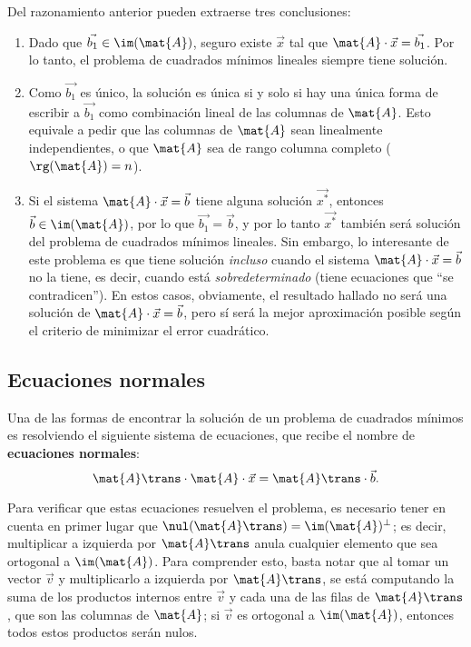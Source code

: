 Del razonamiento anterior pueden extraerse tres conclusiones:
\begin{enumerate}[label=(\roman*)]
\item Dado que $\vec{b_1} \in \im(\mat{A})$, seguro existe $\vec{x}$ tal que
    $\mat{A} \cdot \vec{x} = \vec{b_1}$. Por lo tanto, el problema de
    cuadrados mínimos lineales siempre tiene solución.
\item Como $\vec{b_1}$ es único, la solución es única si y solo si hay
    una única forma de escribir a $\vec{b_1}$ como combinación lineal de las
    columnas de $\mat{A}$. Esto equivale a pedir que las columnas de $\mat{A}$
    sean linealmente independientes, o que $\mat{A}$ sea de rango columna
    completo ($\rg(\mat{A}) = n$).
\item Si el sistema $\mat{A} \cdot \vec{x} = \vec{b}$ tiene alguna solución
    $\vec{x^\ast}$, entonces $\vec{b} \in \im(\mat{A})$, por lo que
    $\vec{b_1} = \vec{b}$, y por lo tanto
    $\vec{x^\ast}$ también será solución del problema de cuadrados mínimos
    lineales.
    Sin embargo, lo interesante de este problema es que tiene solución
    \emph{incluso} cuando el sistema $\mat{A} \cdot \vec{x} = \vec{b}$ no
    la tiene, es decir, cuando está \emph{sobredeterminado} (tiene ecuaciones
    que ``se contradicen''). En estos casos, obviamente, el resultado
    hallado no será una solución de $\mat{A} \cdot \vec{x} = \vec{b}$,
    pero sí será la mejor aproximación posible según el criterio de
    minimizar el error cuadrático.
\end{enumerate}

\subsection{Ecuaciones normales}
Una de las formas de encontrar la solución de un problema de cuadrados
mínimos es resolviendo el siguiente sistema de ecuaciones, que recibe el
nombre de \textbf{ecuaciones normales}:
\[ \mat{A}\trans \cdot \mat{A} \cdot \vec{x} = \mat{A}\trans \cdot \vec{b}. \]

Para verificar que estas ecuaciones resuelven el problema, es necesario tener
en cuenta en primer lugar que
$\nul(\mat{A}\trans) = \im(\mat{A})^{\bot}$; es decir, multiplicar a izquierda
por $\mat{A}\trans$ anula cualquier elemento que sea ortogonal a
$\im(\mat{A})$. Para comprender esto, basta notar que al tomar un
vector $\vec{v}$ y multiplicarlo a izquierda por $\mat{A}\trans$, se está
computando la suma de los productos internos entre $\vec{v}$ y cada una de
las filas de $\mat{A}\trans$, que son las columnas de $\mat{A}$; si $\vec{v}$
es ortogonal a $\im(\mat{A})$, entonces todos estos productos serán nulos.

